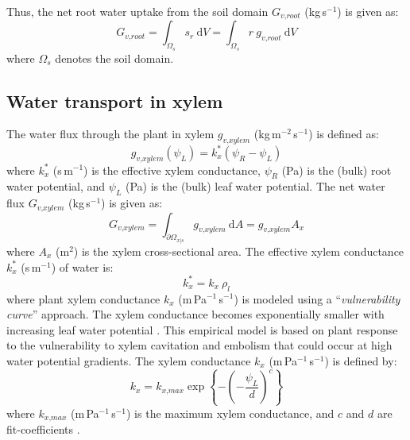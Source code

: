 Thus, the net root water uptake from the soil domain $G_{\textit{v,root}}$ (kg\,s$^{-1}$) is given as:
\begin{equation}
G_{\textit{v,root}} = \int_{\Omega_s} s_r~\mathrm{d}V = \int_{\Omega_s} r~g_{\textit{v,root}}~\mathrm{d}V
\end{equation}
where $\Omega_s$ denotes the soil domain. 


\subsection{Water transport in xylem}

The water flux through the plant in xylem $g_{\textit{v,xylem}}$ (kg\,m$^{-2}$\,s$^{-1}$) is defined as:
\begin{equation}
g_{\textit{v,xylem}}(\psi_L) = k_x^* \left(\psi_R - \psi_L\right)
\end{equation}
where $k_x^*$ (s\,m$^{-1}$) is the effective xylem conductance, $\psi_R$ (Pa) is the (bulk) root water potential, and $\psi_L$ (Pa) is the (bulk) leaf water potential. The net water flux $G_{\textit{v,xylem}}$ (kg\,s$^{-1}$) is given as:
\begin{equation}   
G_{\textit{v,xylem}} = \int_{\partial\Omega_{x|s}} g_{\textit{v,xylem}}~\mathrm{d}A = g_{\textit{v,xylem}} A_x
\label{eq:netwaterflux_xylem}
\end{equation}
where $A_x$ (m$^2$) is the xylem cross-sectional area. The effective xylem conductance $k_x^*$ (s\,m$^{-1}$) of water is:
\begin{equation}
k_x^* = k_x ~ \rho_l
\end{equation}
where plant xylem conductance $k_x$ (m\,Pa$^{-1}$\,s$^{-1}$) is modeled using a ``\textit{vulnerability curve}'' approach. The xylem conductance becomes exponentially smaller with increasing leaf water potential \citep{Volpe2013}. This empirical model is based on plant response to the vulnerability to xylem cavitation and embolism that could occur at high water potential gradients. The xylem conductance $k_x$ (m\,Pa$^{-1}$\,s$^{-1}$) is defined by:
\begin{equation}
k_x = k_{\textit{x,max}} \exp \left\{ - \left( - \frac{\psi_L}{d}\right)^c \right\}
\end{equation}
where $k_{\textit{x,max}}$ (m\,Pa$^{-1}$\,s$^{-1}$) is the maximum xylem conductance, and $c$ and $d$ are fit-coefficients \citep{Volpe2013}.


